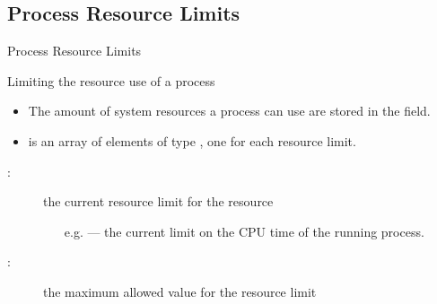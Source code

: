 \subsection{Process Resource Limits}

\begin{frame}{Process Resource Limits}
  \begin{block}{Limiting the resource use of a process}
    \begin{itemize}
    \item The amount of system resources a process can use are stored in the
       field.
    \item {} is an array of elements of type , one for each
      resource limit.
    \end{itemize}
  \end{block}
  \begin{center}
  \end{center}
  \begin{description}
  \item[:] the current resource limit for the resource
    \begin{itemize}
    \item[e.g.]  --- the
      current limit on the CPU time of the running process.
    \end{itemize}
  \item[:] the maximum allowed value for the resource limit
  \end{description}
\end{frame}

